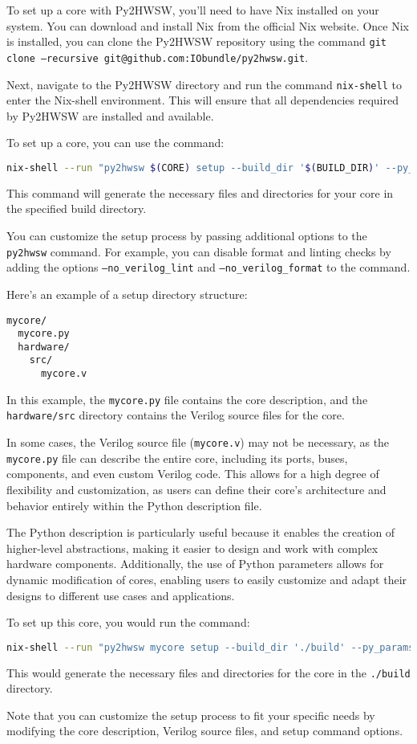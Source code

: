 %

To set up a core with Py2HWSW, you'll need to have Nix installed on your system. You can download and install Nix from the official Nix website. Once Nix is installed, you can clone the Py2HWSW repository using the command \texttt{git clone --recursive git@github.com:IObundle/py2hwsw.git}.

Next, navigate to the Py2HWSW directory and run the command \texttt{nix-shell} to enter the Nix-shell environment. This will ensure that all dependencies required by Py2HWSW are installed and available.

To set up a core, you can use the command:
\begin{lstlisting}[language=bash]
nix-shell --run "py2hwsw $(CORE) setup --build_dir '$(BUILD_DIR)' --py_params 'param1=param1_val:param2=param2_val'"
\end{lstlisting}

This command will generate the necessary files and directories for your core in the specified build directory.

You can customize the setup process by passing additional options to the \texttt{py2hwsw} command. For example, you can disable format and linting checks by adding the options \texttt{--no\_verilog\_lint} and \texttt{--no\_verilog\_format} to the command.

Here's an example of a setup directory structure:
\begin{verbatim}
mycore/
  mycore.py
  hardware/
    src/
      mycore.v
\end{verbatim}
In this example, the \texttt{mycore.py} file contains the core description, and the \texttt{hardware/src} directory contains the Verilog source files for the core.

In some cases, the Verilog source file (\texttt{mycore.v}) may not be necessary, as the \texttt{mycore.py} file can describe the entire core, including its ports, buses, components, and even custom Verilog code. This allows for a high degree of flexibility and customization, as users can define their core's architecture and behavior entirely within the Python description file.

The Python description is particularly useful because it enables the creation of higher-level abstractions, making it easier to design and work with complex hardware components. Additionally, the use of Python parameters allows for dynamic modification of cores, enabling users to easily customize and adapt their designs to different use cases and applications.

To set up this core, you would run the command:
\begin{lstlisting}[language=bash]
nix-shell --run "py2hwsw mycore setup --build_dir './build' --py_params 'param1=param1_val:param2=param2_val'"
\end{lstlisting}

This would generate the necessary files and directories for the core in the \texttt{./build} directory.

Note that you can customize the setup process to fit your specific needs by modifying the core description, Verilog source files, and setup command options.

